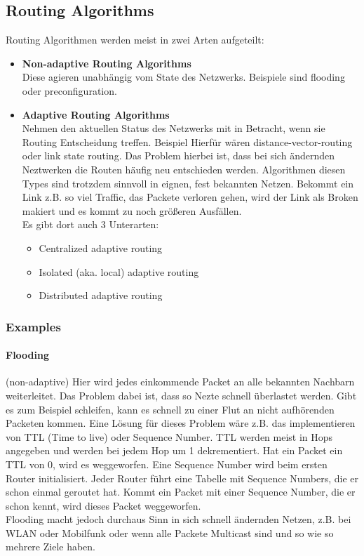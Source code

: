     \subsection{Routing Algorithms}
        Routing Algorithmen werden meist in zwei Arten aufgeteilt:
        \begin{itemize}
            \item \textbf{Non-adaptive Routing Algorithms} \\
                Diese agieren unabhängig vom State des Netzwerks. Beispiele sind flooding oder preconfiguration. 
            \item \textbf{Adaptive Routing Algorithms} \\
                Nehmen den aktuellen Status des Netzwerks mit in Betracht, wenn sie Routing Entscheidung treffen. Beispiel Hierfür wären distance-vector-routing oder link state routing. Das Problem hierbei ist, dass bei sich ändernden Neztwerken die Routen häufig neu entschieden werden. Algorithmen diesen Types sind trotzdem sinnvoll in eignen, fest bekannten Netzen. Bekommt ein Link z.B. so viel Traffic, das Packete verloren gehen, wird der Link als Broken makiert und es kommt zu noch größeren Ausfällen. \\
                Es gibt dort auch 3 Unterarten: 
                \begin{itemize}
                    \item Centralized adaptive routing
                    \item Isolated (aka. local) adaptive routing
                    \item Distributed adaptive routing
                \end{itemize}
        \end{itemize}
        
        \subsubsection{Examples}
            \paragraph{Flooding}
                (non-adaptive) Hier wird jedes einkommende Packet an alle bekannten Nachbarn weiterleitet. Das Problem dabei ist, dass so Nezte schnell überlastet werden. Gibt es zum Beispiel schleifen, kann es schnell zu einer Flut an nicht aufhörenden Packeten kommen. Eine Lösung für dieses Problem wäre z.B. das implementieren von TTL (Time to live) oder Sequence Number. TTL werden meist in Hops angegeben und werden bei jedem Hop um 1 dekrementiert. Hat ein Packet ein TTL von 0, wird es weggeworfen. Eine Sequence Number wird beim ersten Router initialisiert. Jeder Router führt eine Tabelle mit Sequence Numbers, die er schon einmal geroutet hat. Kommt ein Packet mit einer Sequence Number, die er schon kennt, wird dieses Packet weggeworfen. \\
                Flooding macht jedoch durchaus Sinn in sich schnell ändernden Netzen, z.B. bei WLAN oder Mobilfunk oder wenn alle Packete Multicast sind und so wie so mehrere Ziele haben. 
            
